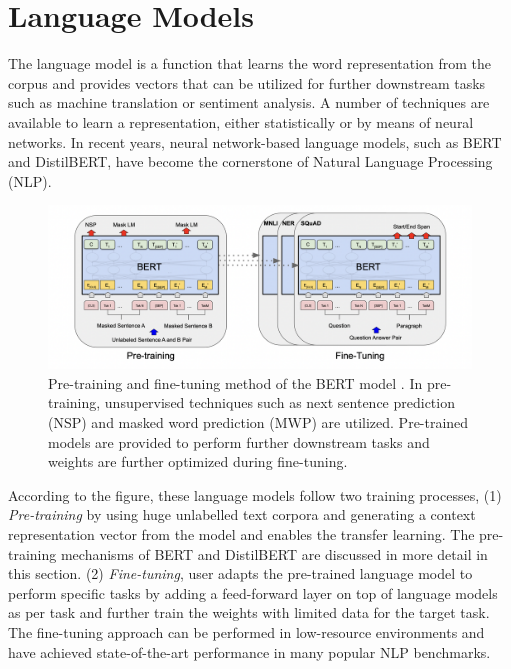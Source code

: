 \documentclass[%
	BCOR=8mm, %
	DIV=12,
	toc=bibliography, %
	toc=listof, %
	oneside, %
	egregdoesnotlikesansseriftitles, %
	]{scrbook}
\begin{document}
\section{Language Models}
\label{section:langaugemodels}
The language model is a function that learns the word representation from the corpus and provides vectors that can be utilized for further downstream tasks such as machine translation or sentiment analysis. A number of techniques are available to learn a representation, either statistically or by means of neural networks. In recent years, neural network-based language models, such as BERT and DistilBERT, have become the cornerstone of Natural Language Processing (NLP). 
\begin{figure}[H]
    \centering
    \includegraphics[width=0.8\linewidth]{img/pre_fintune.png}
    \caption[Diagram of pre-training and fine-tuning of BERT model]{ \small Pre-training and fine-tuning method of the BERT model \cite{devlin_bert_2019-1}. In pre-training, unsupervised techniques such as next sentence prediction (NSP) and masked word prediction (MWP) are utilized. Pre-trained models are provided to perform further downstream tasks and weights are further optimized during fine-tuning.}
    \label{fig:prefintune}
\end{figure}
According to the figure, these language models follow two training processes, (1)\textit{ Pre-training} by using huge unlabelled text corpora and generating a context representation vector from the model \cite{devlin_bert_2019-1}  and enables the transfer learning. The pre-training mechanisms of BERT and DistilBERT are discussed in more detail in this section. (2) \textit{Fine-tuning}, user adapts the pre-trained language model to perform specific tasks by adding a feed-forward layer on top of language models as per task and further train the weights with limited data for the target task. The fine-tuning approach can be performed in low-resource environments and have achieved state-of-the-art performance in many popular NLP benchmarks.
\end{document}
